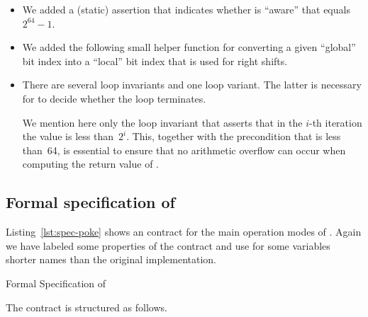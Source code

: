 \begin{itemize}
\item
We added a (static) \acsl assertion that indicates whether \framacwp is ``aware''
that  equals~$2^{64}-1$.

\item
We added the following small helper function for converting a
given ``global'' bit index into a ``local'' bit index that is used for right shifts.

\begin{minipage}{\textwidth}

\end{minipage}
     
\item
There are several loop invariants and one loop variant. 
The latter is necessary for \framacwp to decide whether the loop terminates.

We mention here only the loop invariant that asserts that in the $i$-th iteration
the value  is less than~$2^i$.
This, together with the precondition that 
is less than~64, is essential to ensure that no arithmetic overflow
can occur when computing the return value of \peek.
 
\end{itemize}

\clearpage

\subsection{Formal specification of \poke}
\label{sec:formal-specification-poke}

Listing~\ref{lst:spec-poke} shows an \acsl contract for the 
main operation modes of \poke.
Again we have labeled some properties of the contract
and use for some variables shorter names than the original implementation.


\begin{listing}[hbt]
\begin{minipage}{\textwidth}

\end{minipage}
\caption{\label{lst:spec-poke} Formal Specification of \poke}
\end{listing}

\clearpage 

The contract is structured as follows.

